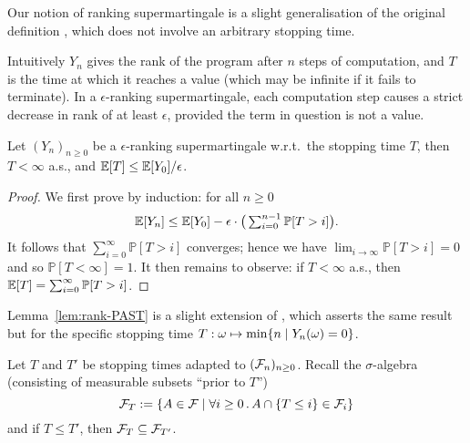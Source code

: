 Our notion of ranking supermartingale is a slight generalisation of the original definition \citep{DBLP:conf/cav/ChakarovS13,DBLP:conf/popl/FioritiH15}, which does not involve an arbitrary stopping time.

Intuitively $Y_n$ gives the rank of the program after $n$ steps of computation, and $T$ is the time at which it reaches a value (which may be infinite if it fails to terminate).
In a $\epsilon$-ranking supermartingale, each computation step causes a strict decrease in rank of at least $\epsilon$, provided the term in question is not a value.

\begin{lemma}\label{lem:rank-PAST}
Let $(Y_n)_{n \geq 0}$ be a $\epsilon$-ranking supermartingale w.r.t.~the stopping time $T$, then $T < \infty$ a.s., and %
$\mathbb{E}[T] \leq {\mathbb{E}[Y_0]}/{\epsilon}$.
\end{lemma}

\begin{proof}%
We first prove by induction: for all $n \geq 0$
\[
\mathbb{E}[Y_n] \leq \mathbb{E}[Y_0] - \epsilon \cdot \big(\textstyle\sum_{i=0}^{n-1} \mathbb{P}[T > i]\big).
\]
It follows that $\sum_{i=0}^{\infty} \mathbb{P}[T > i]$ converges; hence we have $\lim_{i \to \infty} \mathbb{P}[T > i] = 0$ and so $\mathbb{P}[T < \infty] = 1$.
It then remains to observe: if $T < \infty$ a.s., then $\mathbb{E}[T] = \sum^\infty_{i=0} \mathbb{P}[T > i]$.
\end{proof}

Lemma~\ref{lem:rank-PAST} is a slight extension of \cite[Lem.~5.5]{DBLP:conf/popl/FioritiH15},
which asserts the same result but for the specific stopping time $T : \omega \mapsto \min\{n \mid Y_n(\omega) = 0\}$.

Let $T$ and $T'$ be stopping times adapted to $(\mathcal{F}_n)_{n \geq 0}$.
Recall the $\sigma$-algebra (consisting of measurable subsets ``prior to $T$'')
\[
\mathcal{F}_T := \{A \in \mathcal{F} \mid \forall i \geq 0 \, . \, A \cap \{T \leq i\} \in \mathcal{F}_i\}
\]
and if $T \leq T'$, then $\mathcal{F}_{T} \subseteq \mathcal{F}_{T'}$.

